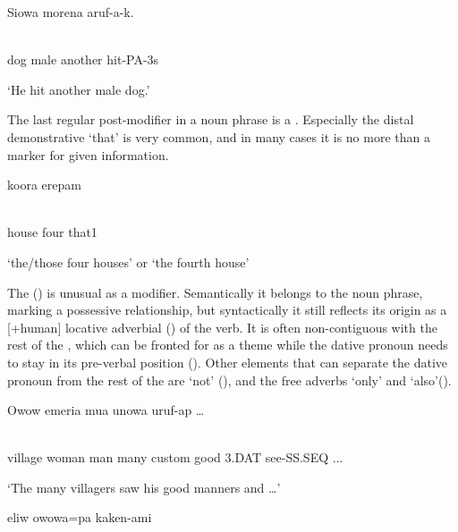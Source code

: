 \ea%
\label{ex:x804}
\gll Siowa  morena    aruf-a-k. \\
      \\
\glt
\z

dog  male  another  hit-PA-3s

`He hit another male dog.'

The last regular post-modifier in a noun phrase is a . Especially the distal demonstrative  `that' is very common, and in many cases it is no more than a marker for given information.

\ea%
\label{ex:x805}
\gll koora  erepam   \\
      \\
\glt
\z

house  four  that1

`the/those four houses' or `the fourth house'

The  () is unusual as a modifier. Semantically it belongs to the noun phrase, marking a possessive relationship, but syntactically it still reflects its origin as a [+human] locative adverbial () of the verb. It is often non-contiguous with the rest of the , which can be fronted for as a theme  while the dative pronoun needs to stay in its pre-verbal position (). Other elements that can separate the dative pronoun from the rest of the  are  `not' (), and the free adverbs  `only' and  `also'(). 

\ea%
\label{ex:x1793}
\gll Owow  emeria  mua  unowa      uruf-ap  {\dots} \\
      \\
\glt
\z

village  woman  man  many  custom  good  3.DAT  see-SS.SEQ  ...

`The many villagers saw his good manners and {\dots}'

\ea%
\label{ex:x1811}
\gll {}    eliw  owowa=pa    kaken-ami  \\
      \\
\glt
\z

